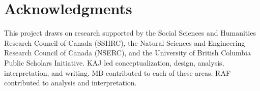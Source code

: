 \section{Acknowledgments}

This project draws on research supported by the Social Sciences and Humanities Research Council of Canada (SSHRC), the Natural Sciences and Engineering Research Council of Canada (NSERC), and the University of British Columbia Public Scholars Initiative. KAJ led conceptualization, design, analysis, interpretation, and writing. MB contributed to each of these areas. RAF contributed to analysis and interpretation. 



\endinput %
